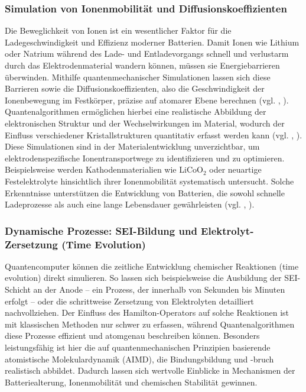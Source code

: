 {\subsubsection{Simulation von Ionenmobilität und Diffusionskoeffizienten}
Die Beweglichkeit von Ionen ist ein wesentlicher Faktor für die Ladegeschwindigkeit und Effizienz moderner Batterien. Damit Ionen wie Lithium oder Natrium während des Lade- und Entladevorgangs schnell und verlustarm durch das Elektrodenmaterial wandern können, müssen sie Energiebarrieren überwinden. Mithilfe quantenmechanischer Simulationen lassen sich diese Barrieren sowie die Diffusionskoeffizienten, also die Geschwindigkeit der Ionenbewegung im Festkörper, präzise auf atomarer Ebene berechnen (vgl. \cite{hanaor_computational_2024}, \cite{urban_computational_2016}). Quantenalgorithmen ermöglichen hierbei eine realistische Abbildung der elektronischen Struktur und der Wechselwirkungen im Material, wodurch der Einfluss verschiedener Kristallstrukturen quantitativ erfasst werden kann (vgl. \cite{aspuru-guzik_simulated_2005}, \cite{baker_simulating_2024}).
Diese Simulationen sind in der Materialentwicklung unverzichtbar, um elektrodenspezifische Ionentransportwege zu identifizieren und zu optimieren. Beispielsweise werden Kathodenmaterialien wie LiCoO$_2$ oder neuartige Festelektrolyte hinsichtlich ihrer Ionenmobilität systematisch untersucht. Solche Erkenntnisse unterstützen die Entwicklung von Batterien, die sowohl schnelle Ladeprozesse als auch eine lange Lebensdauer gewährleisten (vgl. \cite{hanaor_computational_2024}, \cite{urban_computational_2016}).

\subsubsection{Dynamische Prozesse: SEI-Bildung und Elektrolyt-Zersetzung (Time Evolution)}
Quantencomputer können die zeitliche Entwicklung chemischer Reaktionen (time evolution) direkt simulieren. So lassen sich beispielsweise die Ausbildung der SEI-Schicht an der Anode – ein Prozess, der innerhalb von Sekunden bis Minuten erfolgt – oder die schrittweise Zersetzung von Elektrolyten detailliert nachvollziehen. Der Einfluss des Hamilton-Operators auf solche Reaktionen ist mit klassischen Methoden nur schwer zu erfassen, während Quantenalgorithmen diese Prozesse effizient und atomgenau beschreiben können. Besonders leistungsfähig ist hier die auf quantenmechanischen Prinzipien basierende atomistische Molekulardynamik (AIMD), die Bindungsbildung und -bruch realistisch abbildet. Dadurch lassen sich wertvolle Einblicke in Mechanismen der Batteriealterung, Ionenmobilität und chemischen Stabilität gewinnen.
}
